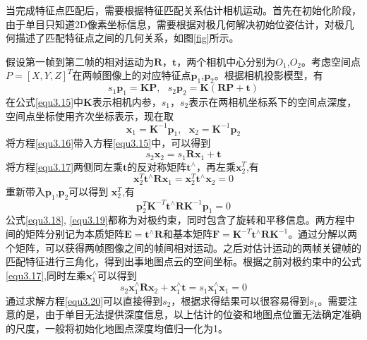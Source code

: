 当完成特征点匹配后，需要根据特征匹配关系估计相机运动。首先在初始化阶段，由于单目只知道2D像素坐标信息，需要根据对极几何解决初始位姿估计，对极几何描述了匹配特征点之间的几何关系，如图\ref{fig}所示。
\begin{figure}
\label{fig3.7}
\end{figure}
假设第一帧到第二帧的相对运动为$\boldsymbol{R}$，$\boldsymbol{t}$，两个相机中心分别为$O_1$,$O_2$。考虑空间点$P=[X,Y,Z]^T$在两帧图像上的对应特征点$\boldsymbol{p}_1$,$\boldsymbol{p}_2$。根据相机投影模型，有
\begin{equation}
\label{equ3.15}
s_1 \boldsymbol{p}_1 = \boldsymbol{K} \boldsymbol{P}, \ \ \ 
s_2 \boldsymbol{p}_2 = \boldsymbol{K} (\boldsymbol{R} \boldsymbol{P}+\boldsymbol{t})
\end{equation}
在公式\eqref{equ3.15}中$\boldsymbol{K}$表示相机内参，$s_1$，$s_2$表示在两相机坐标系下的空间点深度，空间点坐标使用齐次坐标表示，现在取
\begin{equation}
\label{equ3.16}
\boldsymbol{x}_1 = \boldsymbol{K}^{-1} \boldsymbol{p}_1, \ \ \ 
\boldsymbol{x}_2 = \boldsymbol{K}^{-1} \boldsymbol{p}_2
\end{equation}
将方程\eqref{equ3.16}带入方程\eqref{equ3.15}中，可以得到
\begin{equation}
\label{equ3.17}
s_2 \boldsymbol{x}_2 = s_1 \boldsymbol{R} \boldsymbol{x}_1 + \boldsymbol{t}
\end{equation}
将方程\eqref{equ3.17}两侧同左乘$\boldsymbol{t}$的反对称矩阵$\boldsymbol{t}^{\wedge}$，再左乘$\boldsymbol{x}_2^T$,有
\begin{equation}
\label{equ3.18}
\boldsymbol{x}_2^T  \boldsymbol{t}^{\wedge}  \boldsymbol{R} \boldsymbol{x}_1 = \boldsymbol{x}_2^T \boldsymbol{t}^{\wedge} \boldsymbol{x}_2 = 0
\end{equation}
重新带入$\boldsymbol{p}_1$,$\boldsymbol{p}_2$可以得到
$\boldsymbol{x}_2^T$,有
\begin{equation}
\label{equ3.19}
\boldsymbol{p}_2^T \boldsymbol{K}^{-T} \boldsymbol{t}^{\wedge}  \boldsymbol{R} \boldsymbol{K}^{-1} \boldsymbol{p}_1  = 0
\end{equation}
公式\eqref{equ3.18}, \eqref{equ3.19}都称为对极约束，同时包含了旋转和平移信息。两方程中间的矩阵分别记为本质矩阵$\boldsymbol{E} = \boldsymbol{t}^{\wedge}  \boldsymbol{R} $和基本矩阵$\boldsymbol{F} = \boldsymbol{K}^{-T} \boldsymbol{t}^{\wedge}  \boldsymbol{R} \boldsymbol{K}^{-1}$。通过分解以两个矩阵，可以获得两帧图像之间的帧间相对运动。之后对估计运动的两帧关键帧的匹配特征进行三角化，得到出事地图点云的空间坐标。根据之前对极约束中的公式\eqref{equ3.17},同时左乘$\boldsymbol{x}_1^{\wedge}$可以得到
\begin{equation}
\label{equ3.20}
s_2 \boldsymbol{x}_1^{\wedge} \boldsymbol{R} \boldsymbol{x}_2 + \boldsymbol{x}_1^{\wedge} \boldsymbol{t} = s_1 \boldsymbol{x}_1^{\wedge} \boldsymbol{x}_1 = 0
\end{equation}
通过求解方程\eqref{equ3.20}可以直接得到$s_2$，根据求得结果可以很容易得到$s_1$。需要注意的是，由于单目无法提供深度信息，以上估计的位姿和地图点位置无法确定准确的尺度，一般将初始化地图点深度均值归一化为1。

